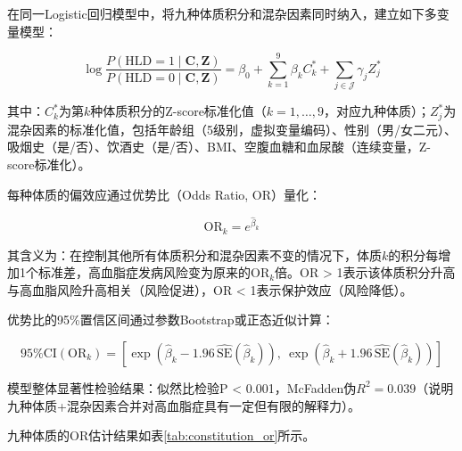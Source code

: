 \documentclass[12pt,a4paper]{ctexart}
\begin{document}
在同一Logistic回归模型中，将九种体质积分和混杂因素同时纳入，建立如下多变量模型：

\begin{equation}
\log\frac{P(\text{HLD}=1 \mid \mathbf{C}, \mathbf{Z})}{P(\text{HLD}=0 \mid \mathbf{C}, \mathbf{Z})} = \beta_0 + \sum_{k=1}^{9}\beta_k C_k^* + \sum_{j \in \mathcal{J}}\gamma_j Z_j^*
\label{eq:logit_constitution}
\end{equation}

其中：$C_k^*$为第$k$种体质积分的Z-score标准化值（$k = 1, \ldots, 9$，对应九种体质）；$Z_j^*$为混杂因素的标准化值，包括年龄组（5级别，虚拟变量编码）、性别（男/女二元）、吸烟史（是/否）、饮酒史（是/否）、BMI、空腹血糖和血尿酸（连续变量，Z-score标准化）。

每种体质的偏效应通过优势比（Odds Ratio, OR）量化：

\begin{equation}
\text{OR}_k = e^{\hat{\beta}_k}
\label{eq:or}
\end{equation}

其含义为：在控制其他所有体质积分和混杂因素不变的情况下，体质$k$的积分每增加1个标准差，高血脂症发病风险变为原来的$\text{OR}_k$倍。OR > 1表示该体质积分升高与高血脂风险升高相关（风险促进），OR < 1表示保护效应（风险降低）。

优势比的95\%置信区间通过参数Bootstrap或正态近似计算：

\begin{equation}
\text{95\%CI}(\text{OR}_k) = \left[\exp\!\left(\hat{\beta}_k - 1.96\, \widehat{\text{SE}}(\hat{\beta}_k)\right),\ \exp\!\left(\hat{\beta}_k + 1.96\, \widehat{\text{SE}}(\hat{\beta}_k)\right)\right]
\label{eq:ci_or}
\end{equation}

模型整体显著性检验结果：似然比检验P < 0.001，McFadden伪$R^2 = 0.039$（说明九种体质+混杂因素合并对高血脂症具有一定但有限的解释力）。

九种体质的OR估计结果如表\ref{tab:constitution_or}所示。
\end{document}
